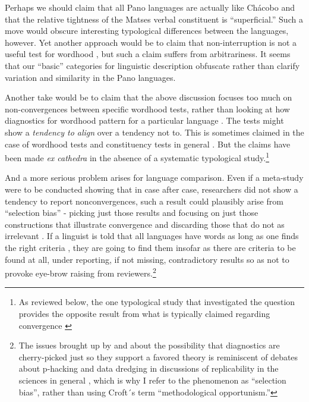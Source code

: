 \documentclass[output=paper,hidelinks]{langscibook}
\begin{document}
Perhaps we should claim that all Pano languages are actually like Chácobo and that the relative tightness of the Matses verbal constituent is ``superficial.'' Such a move would obscure interesting typological differences between the languages, however. Yet another approach would be to claim that non-interruption is not a useful test for wordhood \citep{dixonaikhenvald02}, but such a claim suffers from arbitrariness. It seems that our ``basic'' categories for linguistic description obfuscate rather than clarify variation and similarity in the Pano languages.

Another take would be to claim that the above discussion focuses too much on non-convergences between specific wordhood tests, rather than looking at how diagnostics for wordhood pattern for a particular language \citep{tallmancoincidence:2020}. The tests might show a \textit{tendency to align} over a tendency not to. This is sometimes claimed in the case of wordhood tests \citep{matthews:words} and constituency tests in general \citep{carnie2008constituent, bennett2019syntax}. But the claims have been made \textit{ex cathedra} in the absence of a systematic typological study.\footnote{As reviewed below, the one typological study that investigated the question provides the opposite result from what is typically claimed regarding convergence \citep{schiering2012stress, bickel2009distribution}} 

And a more serious problem arises for language comparison. Even if a meta-study were to be conducted showing that in case after case, researchers did not show a tendency to report nonconvergences, such a result could plausibly arise from ``selection bias'' - picking just those results and focusing on just those constructions that illustrate convergence and discarding those that do not as irrelevant \citep{Croft2001, haspelmathword:2011}. If a linguist is told that all languages have words as long as one finds the right criteria \citep{dixonaikhenvald02}, they are going to find them insofar as there are criteria to be found at all, under reporting, if not missing, contradictory results so as not to provoke eye-brow raising from reviewers.\footnote{The issues brought up by \citet{Croft2001} and \citet{haspelmathword:2011} about the possibility that diagnostics are cherry-picked just so they support a favored theory is reminiscent of debates about p-hacking and data dredging in discussions of replicability in the sciences in general \citep{tallman2021analysis}, which is why I refer to the phenomenon as ``selection bias'', rather than using Croft´s term ``methodological opportunism.''}
\end{document}
